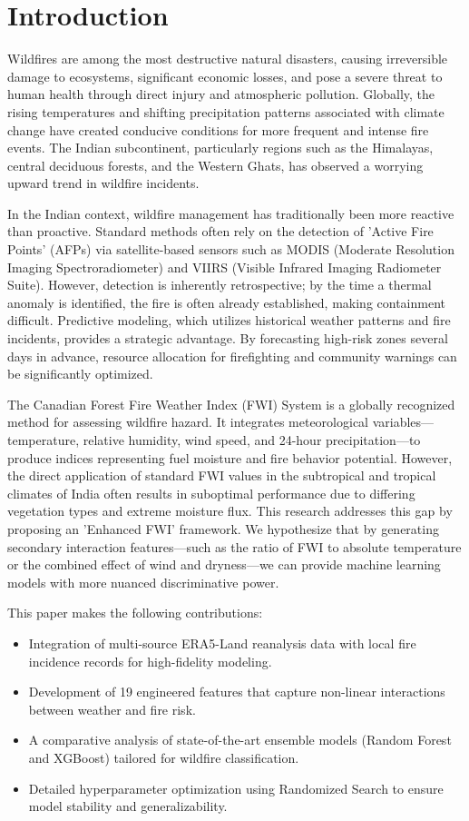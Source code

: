 \documentclass[conference]{IEEEtran}
\begin{document}
\section{Introduction}
Wildfires are among the most destructive natural disasters, causing irreversible damage to ecosystems, significant economic losses, and pose a severe threat to human health through direct injury and atmospheric pollution. Globally, the rising temperatures and shifting precipitation patterns associated with climate change have created conducive conditions for more frequent and intense fire events. The Indian subcontinent, particularly regions such as the Himalayas, central deciduous forests, and the Western Ghats, has observed a worrying upward trend in wildfire incidents.

In the Indian context, wildfire management has traditionally been more reactive than proactive. Standard methods often rely on the detection of 'Active Fire Points' (AFPs) via satellite-based sensors such as MODIS (Moderate Resolution Imaging Spectroradiometer) and VIIRS (Visible Infrared Imaging Radiometer Suite). However, detection is inherently retrospective; by the time a thermal anomaly is identified, the fire is often already established, making containment difficult. Predictive modeling, which utilizes historical weather patterns and fire incidents, provides a strategic advantage. By forecasting high-risk zones several days in advance, resource allocation for firefighting and community warnings can be significantly optimized.

The Canadian Forest Fire Weather Index (FWI) System is a globally recognized method for assessing wildfire hazard. It integrates meteorological variables---temperature, relative humidity, wind speed, and 24-hour precipitation---to produce indices representing fuel moisture and fire behavior potential. However, the direct application of standard FWI values in the subtropical and tropical climates of India often results in suboptimal performance due to differing vegetation types and extreme moisture flux. This research addresses this gap by proposing an 'Enhanced FWI' framework. We hypothesize that by generating secondary interaction features---such as the ratio of FWI to absolute temperature or the combined effect of wind and dryness---we can provide machine learning models with more nuanced discriminative power.

This paper makes the following contributions:
\begin{itemize}
    \item Integration of multi-source ERA5-Land reanalysis data with local fire incidence records for high-fidelity modeling.
    \item Development of 19 engineered features that capture non-linear interactions between weather and fire risk.
    \item A comparative analysis of state-of-the-art ensemble models (Random Forest and XGBoost) tailored for wildfire classification.
    \item Detailed hyperparameter optimization using Randomized Search to ensure model stability and generalizability.
\end{itemize}
\end{document}
